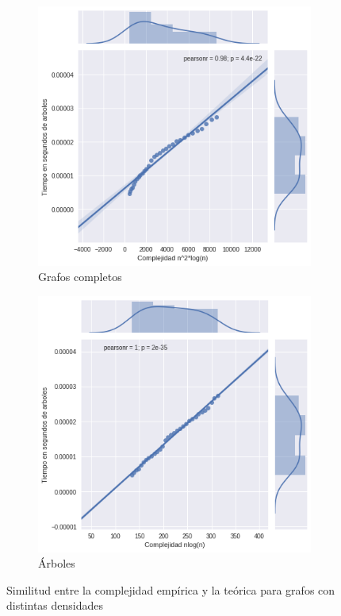 \documentclass[a4paper]{report}
\begin{document}
\begin{figure}[h!]
    \begin{subfigure}{0.5\textwidth}
        \includegraphics[width=1.0\linewidth]{pearsonTreeN2LOGN.png}
        \caption{Grafos completos}
    \end{subfigure}
    \begin{subfigure}{0.5\textwidth}
        \includegraphics[width=1.0\linewidth]{pearsonTreeNLOGN.png}
        \caption{Árboles}
    \end{subfigure}
    \caption{Similitud entre la complejidad empírica y la teórica para grafos con distintas densidades}
    \label{fig:pearsontrees}
\end{figure}
\end{document}
